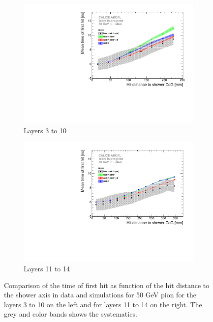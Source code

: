 \documentclass{JINST}
\begin{document}
\begin{figure}[htbp!]
	\begin{subfigure}[t]{0.49\textwidth}
		\centering
		\includegraphics[width=1\textwidth]{fig/Time_Radius_50GeV_SSF_Mokka.pdf}
		\caption{Layers 3 to 10} \label{fig:Radius_SSF_SimData_50GeV}
	\end{subfigure}
	\hfill
	\begin{subfigure}[t]{0.49\textwidth}
		\centering
		\includegraphics[width=1\textwidth]{fig/Time_Radius_50GeV_BL_Mokka.pdf}
		\caption{Layers 11 to 14} \label{fig:Radius_BL_SimData_50GeV}
	\end{subfigure}
	\caption{Comparison of the time of first hit as function of the hit distance to the shower axis in data and simulations for 50 GeV pion for the layers 3 to 10 on the left and for layers 11 to 14 on the right. The grey and color bands shows the systematics.}
	\label{fig:Radius_SSF_SimData_50GeVComparison}
\end{figure}
\end{document}
